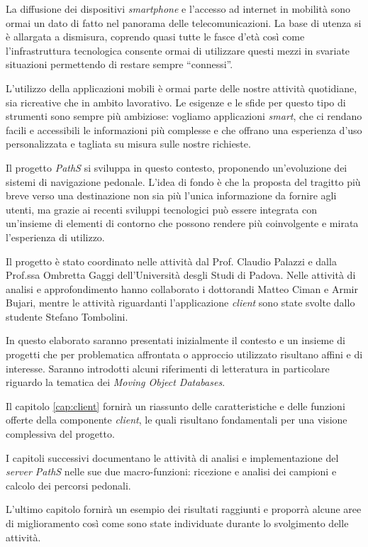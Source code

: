 La diffusione dei dispositivi \emph{smartphone} e l'accesso ad internet in mobilità sono ormai un dato di fatto nel panorama delle telecomunicazioni. La base di utenza si è allargata a dismisura, coprendo quasi tutte le fasce d'età così come l'infrastruttura tecnologica consente ormai di utilizzare questi mezzi in svariate situazioni permettendo di restare sempre ``connessi''. 

L'utilizzo della applicazioni mobili è ormai parte delle nostre attività quotidiane, sia ricreative che in ambito lavorativo. Le esigenze e le sfide per questo tipo di strumenti sono sempre più ambiziose: vogliamo applicazioni \emph{smart}, che ci rendano facili e accessibili le informazioni più complesse e che offrano una esperienza d'uso personalizzata e tagliata su misura sulle nostre richieste.

Il progetto \emph{PathS} si sviluppa in questo contesto, proponendo un'evoluzione dei sistemi di navigazione pedonale. L'idea di fondo è che la  proposta del tragitto più breve verso una destinazione non sia più l'unica informazione da fornire agli utenti, ma grazie ai recenti sviluppi tecnologici può essere integrata con un'insieme di elementi di contorno che possono rendere più coinvolgente e mirata l'esperienza di utilizzo.

Il progetto è stato coordinato nelle attività dal Prof. Claudio Palazzi e dalla Prof.ssa Ombretta Gaggi dell'Università desgli Studi di Padova. Nelle attività di analisi e approfondimento hanno collaborato i dottorandi Matteo Ciman e Armir Bujari, mentre le attività riguardanti l'applicazione \emph{client} sono state svolte dallo studente Stefano Tombolini.

In questo elaborato saranno presentati inizialmente il contesto e un insieme di progetti che per problematica affrontata o approccio utilizzato risultano affini e di interesse. Saranno introdotti alcuni riferimenti di letteratura in particolare riguardo la tematica dei \emph{Moving Object Databases}.

Il capitolo \ref{cap:client} fornirà un riassunto delle caratteristiche e delle funzioni offerte della componente \emph{client}, le quali risultano fondamentali per una visione complessiva del progetto.

I capitoli successivi documentano le attività di analisi e implementazione del \emph{server PathS} nelle sue due macro-funzioni: ricezione e analisi dei campioni e calcolo dei percorsi pedonali.

L'ultimo capitolo fornirà un esempio dei risultati raggiunti e proporrà alcune aree di miglioramento così come sono state individuate durante lo svolgimento delle attività.
